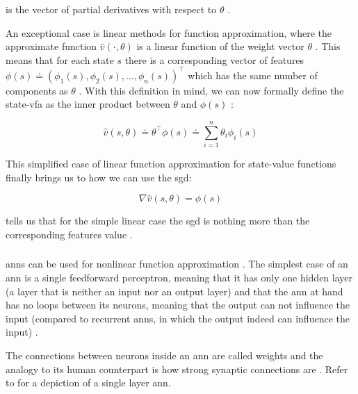 \documentclass{seal_thesis}
\begin{document}
is the vector of partial derivatives with respect to $\theta$ \cite[p. 195]{Sutton2017}.

An exceptional case is linear methods for function approximation, where the approximate function $\hat{v} (\cdot ,\theta)$ is a linear function of the weight vector $\theta$ \cite[p. 198]{Sutton2017}. This means that for each state $s$ there is a corresponding vector of features $\phi (s) \doteq \left( \phi_1 (s), \phi_2 (s), \ldots, \phi_n (s) \right)^\top$ which has the same number of components as $\theta$ \cite[p. 198]{Sutton2017}. With this definition in mind, we can now formally define the state-\gls{vfa} as the inner product between $\theta$ and $\phi (s)$ \cite[p. 198]{Sutton2017}:

\begin{equation}
\label{eq:function_approximation_dot}
	\hat{v} (s,\theta) \doteq \theta^\top \phi (s) \doteq \sum_{i=1}^n \theta_i \phi_i (s)
\end{equation}

This simplified case of linear function approximation for state-value functions finally brings us to how we can use the \gls{sgd}:

\begin{equation}
\label{eq:sgd_linear}
	\nabla \hat{v} (s,\theta) = \phi (s)
\end{equation}

 tells us that for the simple linear case the \gls{sgd} is nothing more than the corresponding features value  \cite[p. 199]{Sutton2017}.

\subsubsection{}
\label{subsubsec:ann_theory}

\glspl{ann} can be used for nonlinear function approximation \cite[p. 199]{Sutton2017}. The simplest case of an \gls{ann} is a single feedforward perceptron, meaning that it has only one hidden layer (\ie a layer that is neither an input nor an output layer) and that the \gls{ann} at hand has no loops between its neurons, meaning that the output can not influence the input (compared to recurrent \glspl{ann}, in which the output indeed can influence the input) \cite[p. 216]{Sutton2017}. 

The connections between neurons inside an \gls{ann} are called weights and the analogy to its human counterpart is how strong synaptic connections are \cite[p. 216]{Sutton2017}. Refer to  for a depiction of a single layer \gls{ann}.
\end{document}
